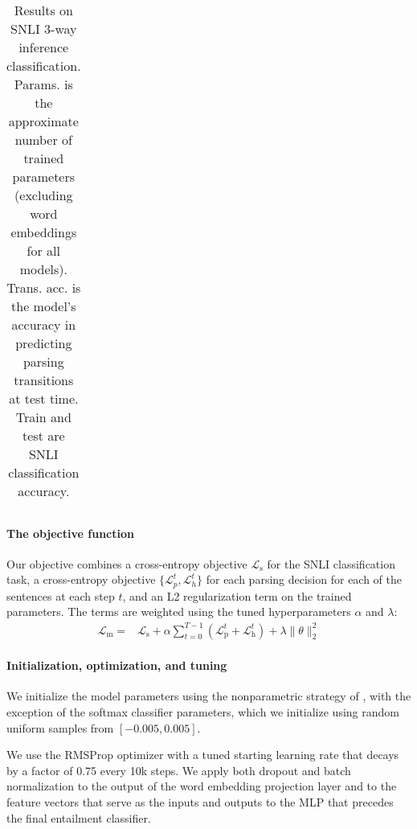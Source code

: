 \documentclass[11pt]{article}
\begin{document}
\begin{table*}[t]
\begin{tabular}{lrrrr}
    \bottomrule
  \end{tabular}
\caption{\protect\label{tab:results}Results on SNLI 3-way inference classification. Params. is the approximate number of trained parameters (excluding word embeddings for all models). Trans. acc. is the model's accuracy in predicting parsing transitions at test time. Train and test are SNLI classification accuracy.} 
\end{table*}


\paragraph{The objective function} Our objective combines a cross-entropy objective $\mathcal{L}_{\text{s}}$ for the SNLI classification task, a cross-entropy objective $\{\mathcal{L}_p^t, \mathcal{L}_h^t\}$ for each parsing decision for each of the sentences at each step $t$, and an L2 regularization term on the trained parameters. The terms are weighted using the tuned hyperparameters $\alpha$ and $\lambda$:
\begin{equation}
\begin{split}
\mathcal{L}_{\text{m}} = &\mathcal{L}_{\text{s}} + \alpha \sum_{t=0}^{T-1} (\mathcal{L}_{\text{p}}^{t} + \mathcal{L}_{\text{h}}^{t}) + \lambda \|\theta\|^2_2
\end{split}
\end{equation}

\paragraph{Initialization, optimization, and tuning}

We initialize the model parameters using the nonparametric strategy of \citet{DBLP:journals/corr/HeZR015}, with the exception of the softmax classifier parameters, which we initialize using random uniform samples from $[-0.005, 0.005]$.

We use the RMSProp optimizer \citep{tieleman2012lecture} with a tuned starting learning rate that decays by a factor of 0.75 every 10k steps. We apply both dropout \citep{srivastava2014dropout} and batch normalization \citep{2015SIoffeCSzegedy} to the output of the word embedding projection layer and to the feature vectors that serve as the inputs and outputs to the MLP that precedes the final entailment classifier.
\end{document}
